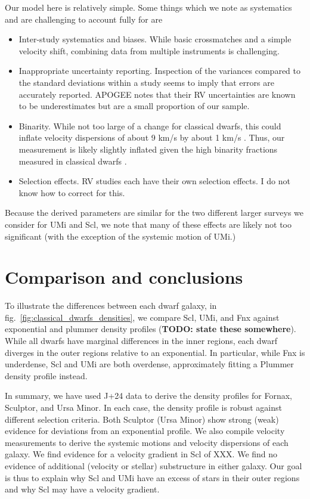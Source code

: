 Our model here is relatively simple. Some things which we note as
systematics and are challenging to account fully for are

\begin{itemize}
\tightlist
\item
  Inter-study systematics and biases. While basic crossmatches and a
  simple velocity shift, combining data from multiple instruments is
  challenging.
\item
  Inappropriate uncertainty reporting. Inspection of the variances
  compared to the standard deviations within a study seems to imply that
  errors are accurately reported. APOGEE notes that their RV
  uncertainties are known to be underestimates but are a small
  proportion of our sample.
\item
  Binarity. While not too large of a change for classical dwarfs, this
  could inflate velocity dispersions of about 9 km/s by about 1 km/s
  \citet{spencer+2017}. Thus, our measurement is likely slightly
  inflated given the high binarity fractions measured in classical
  dwarfs \citep[\citet{spencer+2018}]{arroyo-polonio+2023}.
\item
  Selection effects. RV studies each have their own selection effects. I
  do not know how to correct for this.
\end{itemize}

Because the derived parameters are similar for the two different larger
surveys we consider for UMi and Scl, we note that many of these effects
are likely not too significant (with the exception of the systemic
motion of UMi.)

\section{Comparison and conclusions}\label{comparison-and-conclusions}

To illustrate the differences between each dwarf galaxy, in
fig.~\ref{fig:classical_dwarfs_densities}, we compare Scl, UMi, and Fnx
against exponential and plummer density profiles (\textbf{TODO: state
these somewhere}). While all dwarfs have marginal differences in the
inner regions, each dwarf diverges in the outer regions relative to an
exponential. In particular, while Fnx is underdense, Scl and UMi are
both overdense, approximately fitting a Plummer density profile instead.

In summary, we have used J+24 data to derive the density profiles for
Fornax, Sculptor, and Ursa Minor. In each case, the density profile is
robust against different selection criteria. Both Sculptor (Ursa Minor)
show strong (weak) evidence for deviations from an exponential profile.
We also compile velocity measurements to derive the systemic motions and
velocity dispersions of each galaxy. We find evidence for a velocity
gradient in Scl of XXX. We find no evidence of additional (velocity or
stellar) substructure in either galaxy. Our goal is thus to explain why
Scl and UMi have an excess of stars in their outer regions and why Scl
may have a velocity gradient.

